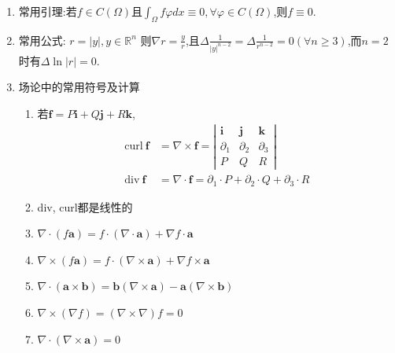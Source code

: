 \documentclass[12pt, a4paper]{article}
\begin{document}
\begin{itemize}
\begin{enumerate}
            \item 常用引理:若$f \in C(\Omega)$且$\int_{\Omega} f \varphi dx \equiv 0, \forall \varphi \in C(\Omega)$,则$f\equiv0$.
            
            \item 常用公式: $ r = |y|, y \in \mathbb{R}^n $ 则$ \nabla r = \frac{y}{r}$,且$\Delta \frac1{|y|^{n-2}} = \Delta \frac1{r^{n-2}} = 0 (\forall n \geq 3)$,而$n=2$时有$\Delta \ln |r| = 0$.
            
            \item 场论中的常用符号及计算
            \begin{enumerate}
                \item 若$\bm f = P \bm i + Q \bm j + R \bm k $, 
                \begin{align*}
                \text{curl}\ \bm f &= \nabla \times \bm f = \left|
                \begin{array}{ccc}
                \bm i & \bm j & \bm k \\
                \partial_1 & \partial_2 & \partial_3 \\
                P & Q & R
                \end{array} \right| \\ 
                \text{div}\ \bm f &= \nabla \cdot \bm f = \partial_1 \cdot P + \partial_2 \cdot Q + \partial_3 \cdot R 
                \end{align*}
                \item div, curl都是线性的
                \item $ \nabla \cdot (f\bm a) = f \cdot (\nabla \cdot \bm a) + \nabla f \cdot \bm a$
                \item $ \nabla \times (f\bm a) = f \cdot(\nabla\times\bm a) + \nabla f \times \bm a$
                \item $ \nabla \cdot (\bm a \times \bm b) = \bm b (\nabla\times\bm a) - \bm a (\nabla\times\bm b)$
                \item $\nabla\times(\nabla f) = (\nabla \times \nabla) f = 0$
                \item $\nabla \cdot (\nabla \times\bm a) = 0$
                

\end{enumerate}
\end{enumerate}
\end{itemize}
\end{document}
